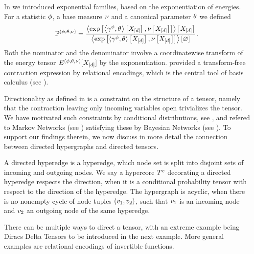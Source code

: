 \begin{example}
    In  we introduced exponential families, based on the exponentiation of energies.
    For a statistic $\phi$, a base measure $\nu$ and a canonical parameter $\theta$ we defined
    \begin{align*}
        \mathbb{P}^{(\phi,\theta,\nu)} = \frac{
            \left\langle \mathrm{exp}\left[\left\langle \gamma^{\phi},\theta\right\rangle \left[ X_{[d]} \right],\nu\left[X_{[d]}\right]\right]\right\rangle \left[ X_{[d]} \right]
        }{
            \left\langle \mathrm{exp}\left[\left\langle \gamma^{\phi},\theta\right\rangle \left[ X_{[d]} \right],\nu\left[X_{[d]}\right]\right]\right\rangle \left[ \varnothing \right]
        } \, .
    \end{align*}
    Both the nominator and the denominator involve a coordinatewise transform of the energy tensor $E^{(\phi,\theta,\nu)}[X_{[d]}]$ by the exponentiation.
     provided a transform-free contraction expression by relational encodings, which is the central tool of basis calculus (see ).
\end{example}





Directionality as defined in  is a constraint on the structure of a tensor, namely that the contraction leaving only incoming variables open trivializes the tensor.
We have motivated such constraints by conditional distributions, see , and refered to Markov Networks (see ) satisfying these by Bayesian Networks (see ).
To support our findings therein, we now discuss in more detail the connection between directed hypergraphs and directed tensors.

\begin{definition}
    A directed hyperedge is a hyperedge, which node set is split into disjoint sets of incoming and outgoing nodes.
    We say a hypercore $T^{e}$ decorating a directed hyperedge respects the direction, when it is a conditional probability tensor with respect to the direction of the hyperedge.
    The hypergraph is acyclic, when there is no nonempty cycle of node tuples $(v_1,v_2)$, such that $v_1$ is an incoming node and $v_2$ an outgoing node of the same hyperedge.
\end{definition}

There can be multiple ways to direct a tensor, with an extreme example being Diracs Delta Tensors to be introduced in the next example.
More general examples are relational encodings of invertible functions.

